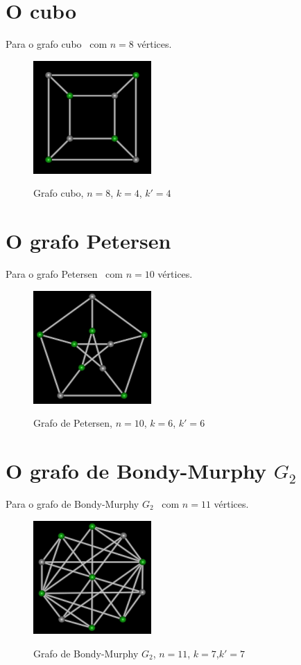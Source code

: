 \section{O cubo}
Para o grafo cubo~\cite{cite:example-plato} com $n=8$ vértices.

\begin{figure}[htb]
\centering
\includegraphics[width=0.4\textwidth]{img/cube.png}
\label{fig:example-cube}
\caption{Grafo cubo, $n=8$, $k=4$, $k'=4$}
\end{figure}


\section{O grafo Petersen}
Para o grafo Petersen~\cite{cite:example-petersen} com $n=10$
vértices.

\begin{figure}[htb]
\centering
\includegraphics[width=0.4\textwidth]{img/petersen.png}
\label{fig:example-petersen}
\caption{Grafo de Petersen, $n=10$, $k=6$, $k'=6$}
\end{figure}


\section{O grafo de Bondy-Murphy $G_2$}
Para o grafo de Bondy-Murphy $G_2$~\cite{cite:example-bondy} com $n=11$
vértices.

\begin{figure}[htb]
\centering
\includegraphics[width=0.4\textwidth]{img/bondymurphyg2.png}
\label{fig:example-bondymurphyg2}
\caption{Grafo de Bondy-Murphy $G_2$, $n=11$, $k=7$,$k'=7$}
\end{figure}


